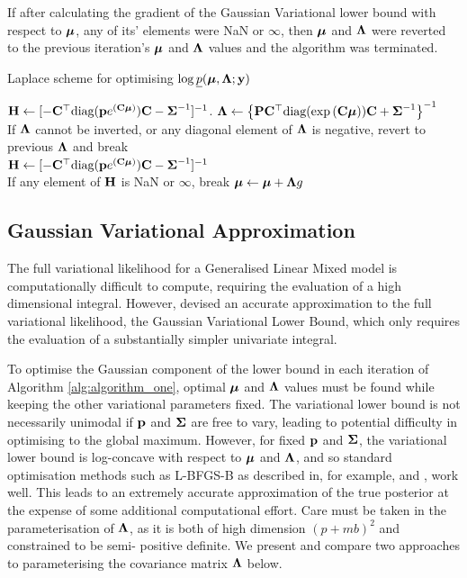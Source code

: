 If after calculating the gradient of the Gaussian Variational lower bound with respect to ${\boldsymbol \mu}$, any of
its' elements were NaN or $\infty$, then ${\boldsymbol \mu}$ and ${\boldsymbol \Lambda}$ were reverted to the previous iteration's
${\boldsymbol \mu}$ and ${\boldsymbol \Lambda}$ values and the algorithm was terminated.
		
\begin{algorithm}
	\caption{Laplace scheme for optimising $\log \underline{p}({\boldsymbol \mu}, {\boldsymbol \Lambda}; {\bf y})$}
	\label{alg:laplace_alg}
	\begin{algorithmic}
		\REQUIRE ${\bf H} \leftarrow [- {\bf C}^\top \text{diag}({\bf p} e^{({\bf C} {\boldsymbol \mu})}) {\bf C} - {\boldsymbol \Sigma}^{-1}]^{-1}$.
		\STATE ${\boldsymbol \Lambda} \leftarrow \left \{{\bf P} {\bf C}^\top \text{diag}(\exp{({\bf C}{\boldsymbol\mu})}) {\bf C} + {\boldsymbol \Sigma}^{-1} \right \}^{-1}$ \\ [1ex] 
		If ${\boldsymbol \Lambda}$ cannot be inverted, or any diagonal element of ${\boldsymbol \Lambda}$ is negative, revert to previous
		${\boldsymbol \Lambda}$ and break \\ [1ex]
		\STATE ${\bf H}
		\leftarrow [- {\bf C}^\top \text{diag}({\bf p} e^{({\bf C} {\boldsymbol \mu})}) {\bf C} - {\boldsymbol \Sigma}^{-1}]^{-1}$ \\ [1ex]
		If any element of ${\bf H}$ is NaN or $\infty$,
		break
		\STATE ${\boldsymbol \mu} \leftarrow {\boldsymbol\mu} + {\boldsymbol \Lambda} g$ \\ [1ex]
		\ENDWHILE
	\end{algorithmic}
\end{algorithm}
		
\subsection{Gaussian Variational Approximation}
		
The full variational likelihood for a Generalised Linear Mixed model is computationally difficult to compute,
requiring the evaluation of a high dimensional integral. However, \cite{Ormerod2012} devised an accurate
approximation to the full variational likelihood, the Gaussian Variational Lower Bound, which only requires
the evaluation of a substantially simpler univariate integral.
	
To optimise the Gaussian component of the lower bound in each iteration of Algorithm \ref{alg:algorithm_one},
optimal ${\boldsymbol \mu}$ and ${\boldsymbol \Lambda}$ values must be found while keeping the other variational parameters fixed. The
variational lower bound is not necessarily unimodal if ${\bf p}$ and ${\boldsymbol \Sigma}$ are free to vary, leading to
potential difficulty in optimising to the global maximum. However, for fixed ${\bf p}$ and ${\boldsymbol \Sigma}$, the
variational lower bound is log-concave with respect to ${\boldsymbol \mu}$ and ${\boldsymbol \Lambda}$, and so standard optimisation
methods such as L-BFGS-B as described in, for example, \cite{Liu1989} and \cite{Nocedal2006}, work well. This
leads to an extremely accurate approximation of the true posterior at the expense of some additional
computational effort. Care must be taken in the parameterisation of ${\boldsymbol \Lambda}$, as it is both of high
dimension $(p + mb)^2$ and constrained to be semi- positive definite. We present and compare two approaches to
parameterising the covariance matrix ${\boldsymbol \Lambda}$ below.
	
